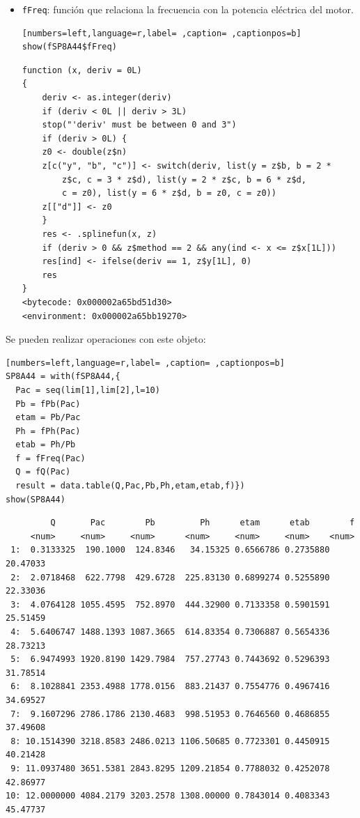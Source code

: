 \begin{itemize}
\begin{itemize}
\item \texttt{fFreq}: función que relaciona la frecuencia con la potencia eléctrica del motor.
\begin{lstlisting}[numbers=left,language=r,label= ,caption= ,captionpos=b]
show(fSP8A44$fFreq)
\end{lstlisting}

\begin{verbatim}
function (x, deriv = 0L) 
{
    deriv <- as.integer(deriv)
    if (deriv < 0L || deriv > 3L) 
	stop("'deriv' must be between 0 and 3")
    if (deriv > 0L) {
	z0 <- double(z$n)
	z[c("y", "b", "c")] <- switch(deriv, list(y = z$b, b = 2 * 
	    z$c, c = 3 * z$d), list(y = 2 * z$c, b = 6 * z$d, 
	    c = z0), list(y = 6 * z$d, b = z0, c = z0))
	z[["d"]] <- z0
    }
    res <- .splinefun(x, z)
    if (deriv > 0 && z$method == 2 && any(ind <- x <= z$x[1L])) 
	res[ind] <- ifelse(deriv == 1, z$y[1L], 0)
    res
}
<bytecode: 0x000002a65bd51d30>
<environment: 0x000002a65bb19270>
\end{verbatim}
\end{itemize}

Se pueden realizar operaciones con este objeto:
\begin{lstlisting}[numbers=left,language=r,label= ,caption= ,captionpos=b]
SP8A44 = with(fSP8A44,{
  Pac = seq(lim[1],lim[2],l=10)
  Pb = fPb(Pac)
  etam = Pb/Pac
  Ph = fPh(Pac)
  etab = Ph/Pb
  f = fFreq(Pac)
  Q = fQ(Pac)
  result = data.table(Q,Pac,Pb,Ph,etam,etab,f)})
show(SP8A44)
\end{lstlisting}

\begin{verbatim}
	     Q       Pac        Pb         Ph      etam      etab        f
	 <num>     <num>     <num>      <num>     <num>     <num>    <num>
 1:  0.3133325  190.1000  124.8346   34.15325 0.6566786 0.2735880 20.47033
 2:  2.0718468  622.7798  429.6728  225.83130 0.6899274 0.5255890 22.33036
 3:  4.0764128 1055.4595  752.8970  444.32900 0.7133358 0.5901591 25.51459
 4:  5.6406747 1488.1393 1087.3665  614.83354 0.7306887 0.5654336 28.73213
 5:  6.9474993 1920.8190 1429.7984  757.27743 0.7443692 0.5296393 31.78514
 6:  8.1028841 2353.4988 1778.0156  883.21437 0.7554776 0.4967416 34.69527
 7:  9.1607296 2786.1786 2130.4683  998.51953 0.7646560 0.4686855 37.49608
 8: 10.1514390 3218.8583 2486.0213 1106.50685 0.7723301 0.4450915 40.21428
 9: 11.0937480 3651.5381 2843.8295 1209.21854 0.7788032 0.4252078 42.86977
10: 12.0000000 4084.2179 3203.2578 1308.00000 0.7843014 0.4083343 45.47737
\end{verbatim}


\end{itemize}
